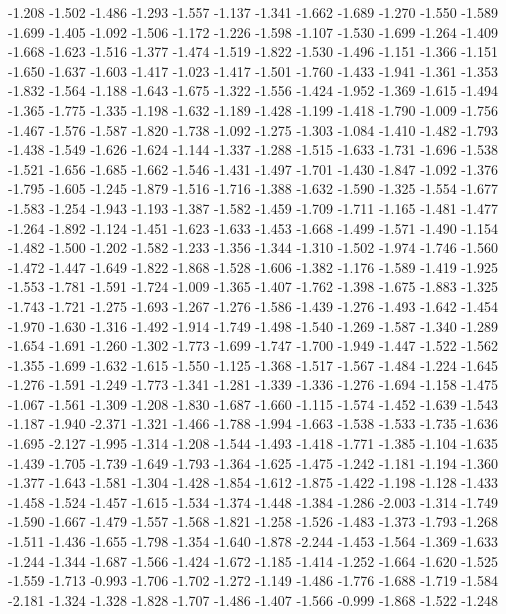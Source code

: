 \documentclass[9pt]{article}
\theoremstyle{plain}
\theoremstyle{definition}
\theoremstyle{remark}
\numberwithin{equation}{section}
\begin{document}
-1.208
-1.502
-1.486
-1.293
-1.557
-1.137
-1.341
-1.662
-1.689
-1.270
-1.550
-1.589
-1.699
-1.405
-1.092
-1.506
-1.172
-1.226
-1.598
-1.107
-1.530
-1.699
-1.264
-1.409
-1.668
-1.623
-1.516
-1.377
-1.474
-1.519
-1.822
-1.530
-1.496
-1.151
-1.366
-1.151
-1.650
-1.637
-1.603
-1.417
-1.023
-1.417
-1.501
-1.760
-1.433
-1.941
-1.361
-1.353
-1.832
-1.564
-1.188
-1.643
-1.675
-1.322
-1.556
-1.424
-1.952
-1.369
-1.615
-1.494
-1.365
-1.775
-1.335
-1.198
-1.632
-1.189
-1.428
-1.199
-1.418
-1.790
-1.009
-1.756
-1.467
-1.576
-1.587
-1.820
-1.738
-1.092
-1.275
-1.303
-1.084
-1.410
-1.482
-1.793
-1.438
-1.549
-1.626
-1.624
-1.144
-1.337
-1.288
-1.515
-1.633
-1.731
-1.696
-1.538
-1.521
-1.656
-1.685
-1.662
-1.546
-1.431
-1.497
-1.701
-1.430
-1.847
-1.092
-1.376
-1.795
-1.605
-1.245
-1.879
-1.516
-1.716
-1.388
-1.632
-1.590
-1.325
-1.554
-1.677
-1.583
-1.254
-1.943
-1.193
-1.387
-1.582
-1.459
-1.709
-1.711
-1.165
-1.481
-1.477
-1.264
-1.892
-1.124
-1.451
-1.623
-1.633
-1.453
-1.668
-1.499
-1.571
-1.490
-1.154
-1.482
-1.500
-1.202
-1.582
-1.233
-1.356
-1.344
-1.310
-1.502
-1.974
-1.746
-1.560
-1.472
-1.447
-1.649
-1.822
-1.868
-1.528
-1.606
-1.382
-1.176
-1.589
-1.419
-1.925
-1.553
-1.781
-1.591
-1.724
-1.009
-1.365
-1.407
-1.762
-1.398
-1.675
-1.883
-1.325
-1.743
-1.721
-1.275
-1.693
-1.267
-1.276
-1.586
-1.439
-1.276
-1.493
-1.642
-1.454
-1.970
-1.630
-1.316
-1.492
-1.914
-1.749
-1.498
-1.540
-1.269
-1.587
-1.340
-1.289
-1.654
-1.691
-1.260
-1.302
-1.773
-1.699
-1.747
-1.700
-1.949
-1.447
-1.522
-1.562
-1.355
-1.699
-1.632
-1.615
-1.550
-1.125
-1.368
-1.517
-1.567
-1.484
-1.224
-1.645
-1.276
-1.591
-1.249
-1.773
-1.341
-1.281
-1.339
-1.336
-1.276
-1.694
-1.158
-1.475
-1.067
-1.561
-1.309
-1.208
-1.830
-1.687
-1.660
-1.115
-1.574
-1.452
-1.639
-1.543
-1.187
-1.940
-2.371
-1.321
-1.466
-1.788
-1.994
-1.663
-1.538
-1.533
-1.735
-1.636
-1.695
-2.127
-1.995
-1.314
-1.208
-1.544
-1.493
-1.418
-1.771
-1.385
-1.104
-1.635
-1.439
-1.705
-1.739
-1.649
-1.793
-1.364
-1.625
-1.475
-1.242
-1.181
-1.194
-1.360
-1.377
-1.643
-1.581
-1.304
-1.428
-1.854
-1.612
-1.875
-1.422
-1.198
-1.128
-1.433
-1.458
-1.524
-1.457
-1.615
-1.534
-1.374
-1.448
-1.384
-1.286
-2.003
-1.314
-1.749
-1.590
-1.667
-1.479
-1.557
-1.568
-1.821
-1.258
-1.526
-1.483
-1.373
-1.793
-1.268
-1.511
-1.436
-1.655
-1.798
-1.354
-1.640
-1.878
-2.244
-1.453
-1.564
-1.369
-1.633
-1.244
-1.344
-1.687
-1.566
-1.424
-1.672
-1.185
-1.414
-1.252
-1.664
-1.620
-1.525
-1.559
-1.713
-0.993
-1.706
-1.702
-1.272
-1.149
-1.486
-1.776
-1.688
-1.719
-1.584
-2.181
-1.324
-1.328
-1.828
-1.707
-1.486
-1.407
-1.566
-0.999
-1.868
-1.522
-1.248
\end{document}
